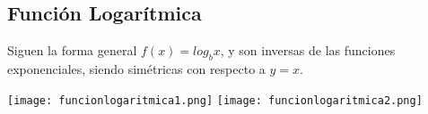 \subsection{Función Logarítmica}
Siguen la forma general $f(x) = log_b{x}$, y son inversas de las funciones exponenciales, siendo simétricas con respecto a $y = x$.\\
\begin{minipage}[c]{\columnwidth}
    \texttt{[image: funcionlogaritmica1.png]}
    \texttt{[image: funcionlogaritmica2.png]}
\end{minipage}